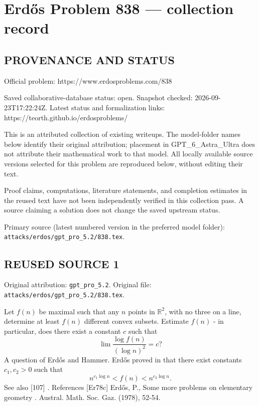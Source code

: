 \section*{Erd\H{o}s Problem 838 --- collection record}

\subsection*{PROVENANCE AND STATUS}
Official problem: https://www.erdosproblems.com/838

Saved collaborative-database status: open.
Snapshot checked: 2026-09-23T17:22:24Z.
Latest status and formalization links: https://teorth.github.io/erdosproblems/

This is an attributed collection of existing writeups. The model-folder names below identify their original attribution; placement in GPT\_6\_Astra\_Ultra does not attribute their mathematical work to that model. All locally available source versions selected for this problem are reproduced below, without editing their text.

Proof claims, computations, literature statements, and completion estimates in the reused text have not been independently verified in this collection pass. A source claiming a solution does not change the saved upstream status.

Primary source (latest numbered version in the preferred model folder): \texttt{attacks/erdos/gpt\_pro\_5.2/838.tex}.

\subsection*{REUSED SOURCE 1}
Original attribution: \texttt{gpt\_pro\_5.2}.
Original file: \texttt{attacks/erdos/gpt\_pro\_5.2/838.tex}.


Let $f(n)$ be maximal such that any $n$ points in $\mathbb{R}^2$, with no three on a line, determine at least $f(n)$ different convex subsets. Estimate $f(n)$ - in particular, does there exist a constant $c$ such that\[\lim \frac{\log f(n)}{(\log n)^2}=c?\] A question of Erd\H{o}s and Hammer. Erd\H{o}s proved in \cite{Er78c} that there exist constants $c_1,c_2>0$ such that\[n^{c_1\log n}<f(n)< n^{c_2\log n}.\]See also [107] . References [Er78c] Erd\H{o}s, P., Some more problems on elementary geometry . Austral. Math. Soc. Gaz. (1978), 52-54.

